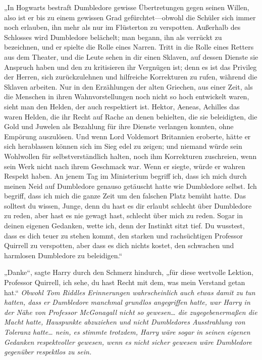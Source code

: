 „In Hogwarts bestraft Dumbledore gewisse Übertretungen gegen seinen Willen, also ist er bis zu einem gewissen Grad gefürchtet—obwohl die Schüler sich immer noch erlauben, ihn mehr als nur im Flüsterton zu verspotten. Außerhalb des Schlosses wird Dumbledore belächelt; man begann, ihn als verrückt zu bezeichnen, und er spielte die Rolle eines Narren. Tritt in die Rolle eines Retters aus dem Theater, und die Leute sehen in dir einen Sklaven, auf dessen Dienste sie Anspruch haben und den zu kritisieren ihr Vergnügen ist; denn es ist das Privileg der Herren, sich zurückzulehnen und hilfreiche Korrekturen zu rufen, während die Sklaven arbeiten. Nur in den Erzählungen der alten Griechen, aus einer Zeit, als die Menschen in ihren Wahnvorstellungen noch nicht so hoch entwickelt waren, sieht man den Helden, der auch respektiert ist. Hektor, Aeneas, Achilles das waren Helden, die ihr Recht auf Rache an denen behielten, die sie beleidigten, die Gold und Juwelen als Bezahlung für ihre Dienste verlangen konnten, ohne Empörung auszulösen. Und wenn Lord Voldemort Britannien eroberte, hätte er sich herablassen können sich im Sieg edel zu zeigen; und niemand würde sein Wohlwollen für selbstverständlich halten, noch ihm Korrekturen zuschreien, wenn sein Werk nicht nach ihrem Geschmack war. Wenn er siegte, würde er wahren Respekt haben. An jenem Tag im Ministerium begriff ich, dass ich mich durch meinen Neid auf Dumbledore genauso getäuscht hatte wie Dumbledore selbst. Ich begriff, dass ich mich die ganze Zeit um den falschen Platz bemüht hatte. Das solltest du wissen, Junge, denn du hast es dir erlaubt schlecht über Dumbledore zu reden, aber hast es nie gewagt hast, schlecht über mich zu reden. Sogar in deinen eigenen Gedanken, wette ich, denn der Instinkt sitzt tief. Du wusstest, dass es dich teuer zu stehen kommt, den starken und rachsüchtigen Professor Quirrell zu verspotten, aber dass es dich nichts kostet, den schwachen und harmlosen Dumbledore zu beleidigen.“

„Danke“, sagte Harry durch den Schmerz hindurch, „für diese wertvolle Lektion, Professor Quirrell, ich sehe, du hast Recht mit dem, was mein Verstand getan hat.“
\emph{Obwohl Tom Riddles Erinnerungen wahrscheinlich auch etwas damit zu tun hatten, dass er Dumbledore manchmal grundlos angegriffen hatte, war Harry in der Nähe von Professor McGonagall nicht so gewesen… die zugegebenermaßen die Macht hatte, Hauspunkte abzuziehen und nicht Dumbledores Ausstrahlung von Toleranz hatte… nein, es stimmte trotzdem, Harry wäre sogar in seinen eigenen Gedanken respektvoller gewesen, wenn es nicht \emph{sicher} gewesen wäre Dumbledore gegenüber respektlos zu sein.}

